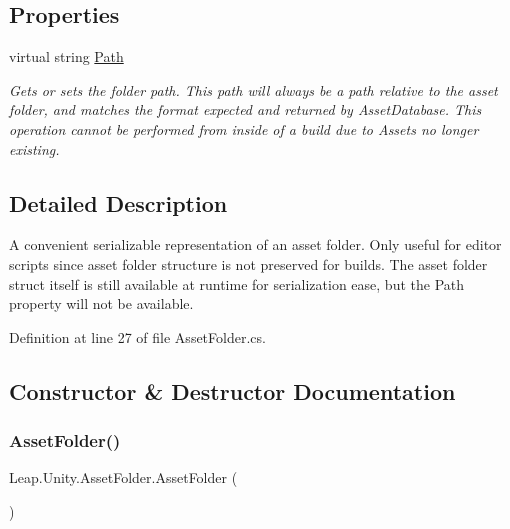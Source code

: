 \subsection*{Properties}
\begin{DoxyCompactItemize}
\item 
virtual string \mbox{\hyperlink{class_leap_1_1_unity_1_1_asset_folder_ac67aee1b93835ce53ca986c6e800532b}{Path}}
\begin{DoxyCompactList}\small\item\em Gets or sets the folder path. This path will always be a path relative to the asset folder, and matches the format expected and returned by Asset\+Database. This operation cannot be performed from inside of a build due to Assets no longer existing. \end{DoxyCompactList}\end{DoxyCompactItemize}


\subsection{Detailed Description}
A convenient serializable representation of an asset folder. Only useful for editor scripts since asset folder structure is not preserved for builds. The asset folder struct itself is still available at runtime for serialization ease, but the Path property will not be available. 



Definition at line 27 of file Asset\+Folder.\+cs.



\subsection{Constructor \& Destructor Documentation}
\mbox{\label{class_leap_1_1_unity_1_1_asset_folder_acbcab66af8e41b59814f26c5243e34fd}} 
\subsubsection{\texorpdfstring{AssetFolder()}{AssetFolder()}\hspace{0.1cm}{\footnotesize\ttfamily [1/2]}}
{\footnotesize\ttfamily Leap.\+Unity.\+Asset\+Folder.\+Asset\+Folder (\begin{DoxyParamCaption}{ }\end{DoxyParamCaption})}




